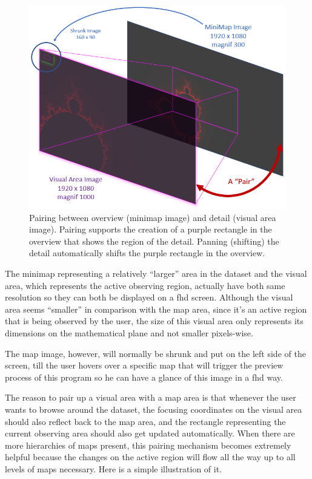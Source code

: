 \begin{figure}[th]
\centering
\includegraphics[width=\textwidth,keepaspectratio]{Figures/Chapter4/mapvisualpair.png}
\decoRule
\caption[Map Visual Pair]{Pairing between overview (minimap image) and detail (visual area image). Pairing supports the creation of a purple rectangle in the overview that shows the region of the detail. Panning (shifting) the detail automatically shifts the purple rectangle in the overview.}
\label{fig:mapvisualpair}
\end{figure}

The minimap representing a relatively ``larger'' area in the dataset and the visual area, which represents the active observing region, actually have both same resolution so they can both be displayed on a \gls{fhd} screen. Although the visual area seems ``smaller'' in comparison with the \gls{map} area, since it's an active region that is being observed by the user, the size of this visual area only represents its dimensions on the mathematical plane and not smaller pixels-wise.

The \gls{map} image, however, will normally be shrunk and put on the left side of the screen, till the user hovers over a specific \gls{map} that will trigger the preview process of this program so he can have a glance of this image in a \gls{fhd} way.

The reason to pair up a visual area with a \gls{map} area is that whenever the user wants to browse around the dataset, the focusing coordinates on the visual area should also reflect back to the \gls{map} area, and the rectangle representing the current observing area should also get updated automatically. When there are more hierarchies of \glspl{map} present, this pairing mechanism becomes extremely helpful because the changes on the active region will flow all the way up to all levels of \glspl{map} necessary. Here  is a simple illustration of it.

